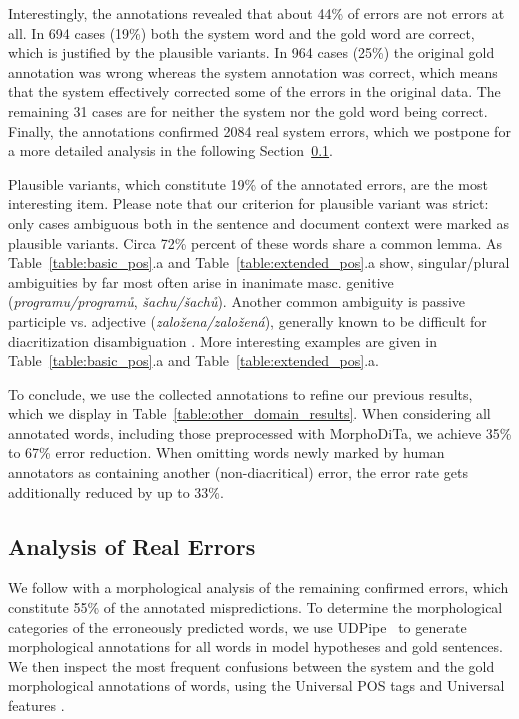 \documentclass{pbmlarxiv}
\begin{document}
Interestingly, the annotations revealed that about 44\% of errors are not errors at all. In 694 cases (19\%) both the system word and the gold word are correct, which is justified by the plausible variants. In 964 cases (25\%) the original gold annotation was wrong whereas the system annotation was correct, which means that the system effectively corrected some of the errors in the original data. The remaining 31 cases are for neither the system nor the gold word being correct. Finally, the annotations confirmed 2084 real system errors, which we postpone for a more detailed analysis in the following Section~\ref{sec:real_errors}.

Plausible variants, which constitute 19\% of the annotated errors, are the most interesting item. Please note that our criterion for plausible variant was strict: only cases ambiguous both in the sentence and document context were marked as plausible variants. Circa 72\% percent of these words share a common lemma. As Table~\ref{table:basic_pos}.a and Table~\ref{table:extended_pos}.a show, singular/plural ambiguities by far most often arise in inanimate masc. genitive (\textit{programu/programů}, \textit{šachu/šachů}).
Another common ambiguity is passive participle vs. adjective (\textit{založena/založená}), generally known to be difficult for diacritization disambiguation \cite{NovyEncyklopedickySlovnik}. More interesting examples are given in Table~\ref{table:basic_pos}.a and Table~\ref{table:extended_pos}.a.









To conclude, we use the collected annotations to refine our previous results, which we display in Table~\ref{table:other_domain_results}. When considering all annotated words, including those preprocessed with MorphoDiTa, we achieve 35\% to 67\% error reduction. When omitting words newly marked by human annotators as containing another (non-diacritical) error, the error rate gets additionally reduced by up to 33\%.

\subsection{Analysis of Real Errors}
\label{sec:real_errors}

We follow with a morphological analysis of the remaining confirmed errors, which constitute 55\% of the annotated mispredictions. To determine the morphological categories of the erroneously predicted words, we use UDPipe~\citep{tsd2019_czech_nlp} to generate morphological annotations for all words in model hypotheses and gold sentences. We then inspect the most frequent confusions between the system and the gold morphological annotations of words, using the Universal POS tags and Universal features \cite{nivre-etal-2020-universal}.
\end{document}
